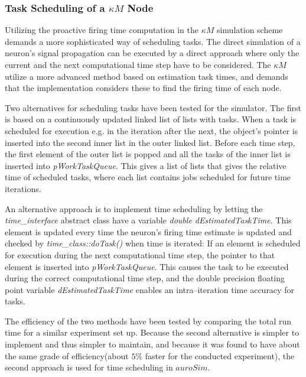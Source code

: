 		\subsubsection{Task Scheduling of a $\kappa M$ Node}
			Utilizing the proactive firing time computation in the $\kappa M$ simulation scheme demands a more sophisticated way of scheduling tasks.
			The direct simulation of a neuron's signal propagation can be executed by a direct approach where only the current and the next computational time step have to be considered.
			The $\kappa M$ utilize a more advanced method based on estimation task times, and demands that the implementation considers these to find the firing time of each node.
			
			Two alternatives for scheduling tasks have been tested for the simulator.
			The first is based on a continuously updated linked list of lists with tasks. %
			When a task is scheduled for execution e.g. in the iteration after the next, the object's pointer is inserted into the second inner list in the outer linked list.
			Before each time step, the first element of the outer list is popped and all the tasks of the inner list is inserted into \emph{pWorkTaskQueue}.
			This gives a list of lists that gives the relative time of scheduled tasks, where each list contains jobs scheduled for future time iterations.
			
			An alternative approach is to implement time scheduling by letting the \emph{time\_interface} abstract class have a variable \emph{double dEstimatedTaskTime}.
			This element is updated every time the neuron's firing time estimate is updated and checked by \emph{time\_class::doTask()} when time is iterated:
				If an element is scheduled for execution during the next computational time step, the pointer to that element is inserted into \emph{pWorkTaskQueue}.
			This causes the task to be executed during the correct computational time step, 
				and the double precision floating point variable \emph{dEstimatedTaskTime} enables an intra--iteration time accuracy for tasks. 

			The efficiency of the two methods have been tested by comparing the total run time for a similar experiment set up.
			Because the second alternative is simpler to implement and thus simpler to maintain,
				and because it was found to have about the same grade of efficiency(about $5\%$ faster for the conducted experiment),
				the second approach is used for time scheduling in $auroSim$. %
			
